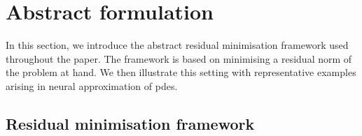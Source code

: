 \documentclass[oneside,reqno,11pt,a4paper]{amsart}
\theoremstyle{definition}
\begin{document}
\providecommand{\calN}{\mathcal{N}}
\providecommand{\calM}{\mathcal{M}}
\providecommand{\calF}{\mathcal{F}}
\providecommand{\calT}{\mathcal{T}}
\providecommand{\calQ}{\mathcal{Q}}
\providecommand{\calE}{\mathcal{E}}
\providecommand{\calL}{\mathcal{L}}
\providecommand{\calJ}{\mathcal{J}}
\providecommand{\calR}{\mathcal{R}}

\providecommand{\scrJ}{\mathscr{J}} 
\providecommand{\scrL}{\mathscr{L}}
\providecommand{\scrE}{\mathscr{E}}

\newcommand{\op}[1]{\mathcal{#1}}

\section{Abstract formulation} \label{sec:abstract-formulation}

In this section, we introduce the abstract residual minimisation framework used
throughout the paper. The framework is based on minimising a residual norm of
the problem at hand. We then illustrate this setting with representative
examples arising in neural approximation of \acp{pde}.

\subsection{Residual minimisation framework}
\end{document}
